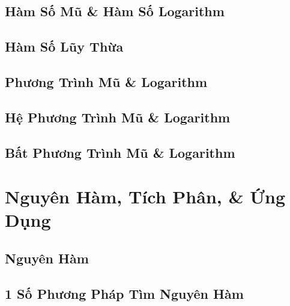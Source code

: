 \documentclass[oneside]{book}
\numberwithin{equation}{section}
\begin{document}

\section{Hàm Số Mũ \& Hàm Số Logarithm}


\section{Hàm Số Lũy Thừa}


\section{Phương Trình Mũ \& Logarithm}


\section{Hệ Phương Trình Mũ \& Logarithm}


\section{Bất Phương Trình Mũ \& Logarithm}


\chapter{Nguyên Hàm, Tích Phân, \& Ứng Dụng}

\section{Nguyên Hàm}


\section{1 Số Phương Pháp Tìm Nguyên Hàm}
\end{document}
